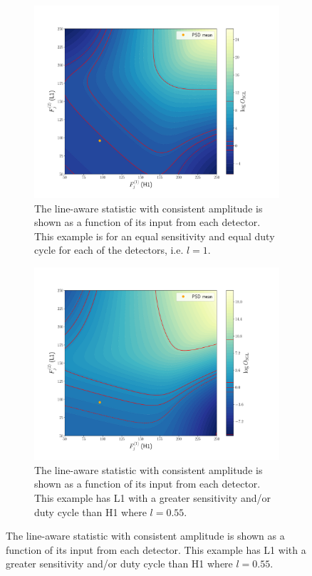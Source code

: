 \begin{figure}
\centering

\begin{subfigure}[h]{\linewidth}
\begin{minipage}{0.65\linewidth}
\includegraphics[width=0.9\linewidth]{C3_soap/lookup_3d_2.pdf}
\end{minipage}\hfill
\begin{minipage}{0.35\linewidth}
\caption{The line-aware statistic with consistent amplitude is shown as a function of its input from each detector. This example is for an equal sensitivity and equal duty cycle for each of the detectors, i.e. $l=1$.}
\label{soap:lineawareamp:plot:noline}
\end{minipage}
\end{subfigure}
\begin{subfigure}[h]{\linewidth}
\begin{minipage}{0.65\linewidth}
\includegraphics[width=0.9\columnwidth]{C3_soap/lookup_3d_1.pdf}
\end{minipage}\hfill
\begin{minipage}{0.35\linewidth}
\caption{The line-aware statistic with consistent amplitude is shown as a function of its input from each detector. This example has L1 with a greater sensitivity and/or duty cycle than H1 where $l=0.55$. }
\label{soap:lineawareamp:plot:linesmall}
\end{minipage}
\end{subfigure}


\end{figure}
